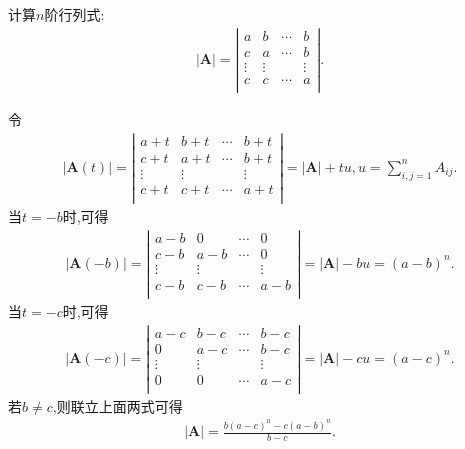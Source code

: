 \documentclass[../../main.tex]{subfiles}
\begin{document}
\begin{proposition}\label{proposition:常见行列式1}
计算$n$阶行列式:
\begin{align*}
|\boldsymbol{A}|=\left| \begin{matrix}
a&		b&		\cdots&		b\\
c&		a&		\cdots&		b\\
\vdots&		\vdots&		&		\vdots\\
c&		c&		\cdots&		a\\
\end{matrix} \right|.
\end{align*}
\end{proposition}
\begin{solution}
{\color{blue}}
令
\begin{align*}
|\boldsymbol{A}(t)|=\left| \begin{matrix}
a+t&		b+t&		\cdots&		b+t\\
c+t&		a+t&		\cdots&		b+t\\
\vdots&		\vdots&		&		\vdots\\
c+t&		c+t&		\cdots&		a+t\\
\end{matrix} \right|=|\boldsymbol{A}|+tu,  u=\sum_{i,j=1}^n{A_{ij}.}
\nonumber
\end{align*}
当$t=-b$时,可得
\begin{align*}
|\boldsymbol{A}(-b)|=\left| \begin{matrix}
a-b&		0&		\cdots&		0\\
c-b&		a-b&		\cdots&		0\\
\vdots&		\vdots&		&		\vdots\\
c-b&		c-b&		\cdots&		a-b\\
\end{matrix} \right|=|\boldsymbol{A}|-bu=(a-b)^n.
\end{align*}
当$t=-c$时,可得
\begin{align*}
|\boldsymbol{A}(-c)|=\left| \begin{matrix}
a-c&		b-c&		\cdots&		b-c\\
0&		a-c&		\cdots&		b-c\\
\vdots&		\vdots&		&		\vdots\\
0&		0&		\cdots&		a-c\\
\end{matrix} \right|=|\boldsymbol{A}|-cu=(a-c)^n.
\end{align*}
若$b\ne c$,则联立上面两式可得
\begin{align*}
\left| \boldsymbol{A} \right|=\frac{b\left( a-c \right) ^n-c\left( a-b \right) ^n}{b-c}.

\end{align*}
\end{solution}
\end{document}

